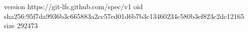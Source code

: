 version https://git-lfs.github.com/spec/v1
oid sha256:95f7da9936b3c665883a2cc57ed01d6b7b3c13460234c580b3ef823c2dc12165
size 292473
